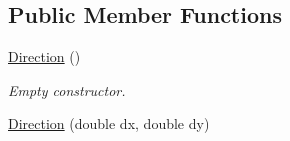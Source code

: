 \subsection*{\-Public \-Member \-Functions}
\begin{DoxyCompactItemize}
\item 
\hypertarget{class_direction_aba0c848f9db9831e6feb64d978e6d019}{\hyperlink{class_direction_aba0c848f9db9831e6feb64d978e6d019}{\-Direction} ()}\label{class_direction_aba0c848f9db9831e6feb64d978e6d019}

\begin{DoxyCompactList}\small\item\em \-Empty constructor. \end{DoxyCompactList}\item 
\hypertarget{class_direction_abe8672abbbc5f540acaa0d2d03f4f237}{\hyperlink{class_direction_abe8672abbbc5f540acaa0d2d03f4f237}{\-Direction} (double dx, double dy)}\label{class_direction_abe8672abbbc5f540acaa0d2d03f4f237}


\end{DoxyCompactItemize}
